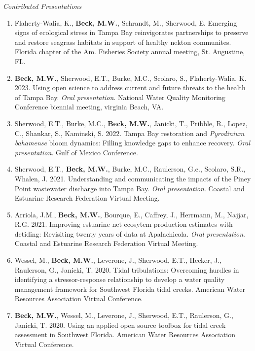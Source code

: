 \documentclass[letterpaper,12pt]{article}
\begin{document}
\vspace{\baselineskip} 
\centerline{\large{\textit{Contributed Presentations}}}

\begin{enumerate}

\item Flaherty-Walia, K., {\bf Beck, M.W.}, Schrandt, M., Sherwood, E. Emerging signs of ecological stress in Tampa Bay reinvigorates partnerships to preserve and restore seagrass habitats in support of healthy nekton communites. Florida chapter of the Am. Fisheries Society annual meeting, St. Augustine, FL.

\item {\bf Beck, M.W.}, Sherwood, E.T., Burke, M.C., Scolaro, S., Flaherty-Walia, K. 2023. Using open science to address current and future threats to the health of Tampa Bay. \textit{Oral presentation}. National Water Quality Monitoring Conference biennial meeting, virginia Beach, VA.

\item Sherwood, E.T., Burke, M.C., {\bf Beck, M.W.}, Janicki, T., Pribble, R., Lopez, C., Shankar, S., Kaminski, S. 2022. Tampa Bay restoration and \textit{Pyrodinium bahamense} bloom dynamics: Filling knowledge gaps to enhance recovery. \textit{Oral presentation}. Gulf of Mexico Conference.

\item Sherwood, E.T., {\bf Beck, M.W.}, Burke, M.C., Raulerson, G.e., Scolaro, S.R., Whalen, J. 2021. Understanding and communicating the impacts of the Piney Point wastewater discharge into Tampa Bay. \textit{Oral presentation}. Coastal and Estuarine Research Federation Virtual Meeting.

\item Arriola, J.M., {\bf Beck, M.W.}, Bourque, E., Caffrey, J., Herrmann, M., Najjar, R.G. 2021. Improving estuarine net ecosytem production estimates with detiding: Revisiting twenty years of data at Apalachicola. \textit{Oral presentation}. Coastal and Estuarine Research Federation Virtual Meeting.

\item Wessel, M., \textbf{Beck, M.W.}, Leverone, J., Sherwood, E.T., Hecker, J., Raulerson, G., Janicki, T. 2020. Tidal tribulations: Overcoming hurdles in identifying a stressor-response relationship to develop a water quality management framework for Southwest Florida tidal creeks. American Water Resources Association Virtual Conference. 

\item \textbf{Beck, M.W.}, Wessel, M., Leverone, J., Sherwood, E.T., Raulerson, G., Janicki, T. 2020. Using an applied open source toolbox for tidal creek assessment in Southwest Florida. American Water Resources Association Virtual Conference. 


\end{enumerate}
\end{document}
